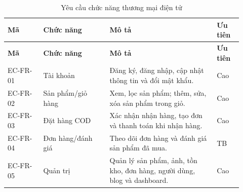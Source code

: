 \begin{longtable}{|p{0.14\linewidth}|p{0.26\linewidth}|p{0.42\linewidth}|p{0.10\linewidth}|}
\caption{Yêu cầu chức năng thương mại điện tử}\label{tab:ecommerce-functional-requirements}\\
\hline
\textbf{Mã} & \textbf{Chức năng} & \textbf{Mô tả} & \textbf{Ưu tiên} \\
\hline
\endfirsthead
\hline
\textbf{Mã} & \textbf{Chức năng} & \textbf{Mô tả} & \textbf{Ưu tiên} \\
\hline
\endhead
EC-FR-01 & Tài khoản & Đăng ký, đăng nhập, cập nhật thông tin và đổi mật khẩu. & Cao \\
\hline
EC-FR-02 & Sản phẩm/giỏ hàng & Xem, lọc sản phẩm; thêm, sửa, xóa sản phẩm trong giỏ. & Cao \\
\hline
EC-FR-03 & Đặt hàng COD & Xác nhận nhận hàng, tạo đơn và thanh toán khi nhận hàng. & Cao \\
\hline
EC-FR-04 & Đơn hàng/đánh giá & Theo dõi đơn hàng và đánh giá sản phẩm đã mua. & TB \\
\hline
EC-FR-05 & Quản trị & Quản lý sản phẩm, ảnh, tồn kho, đơn hàng, người dùng, blog và dashboard. & Cao \\
\hline
\end{longtable}
